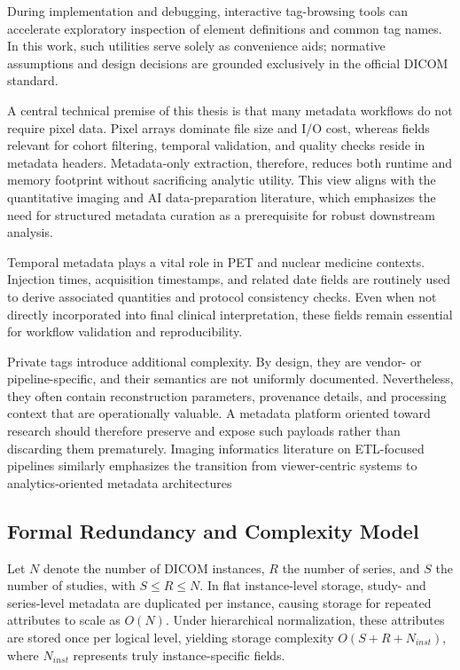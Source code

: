 During implementation and debugging, interactive tag-browsing tools can accelerate exploratory inspection of element definitions and common tag names\cite{dicomlookup}. In this work, such utilities serve solely as convenience aids; normative assumptions and design decisions are grounded exclusively in the official DICOM standard\cite{dicom}.

A central technical premise of this thesis is that many metadata workflows do not require pixel data. Pixel arrays dominate file size and I/O cost, whereas fields relevant for cohort filtering, temporal validation, and quality checks reside in metadata headers. Metadata-only extraction, therefore, reduces both runtime and memory footprint without sacrificing analytic utility. This view aligns with the quantitative imaging and AI data-preparation literature, which emphasizes the need for structured metadata curation as a prerequisite for robust downstream analysis\cite{fedorov_qin, DIAZ202125}.

Temporal metadata plays a vital role in PET and nuclear medicine contexts. Injection times, acquisition timestamps, and related date fields are routinely used to derive associated quantities and protocol consistency checks. Even when not directly incorporated into final clinical interpretation, these fields remain essential for workflow validation and reproducibility.

Private tags introduce additional complexity. By design, they are vendor- or pipeline-specific, and their semantics are not uniformly documented. Nevertheless, they often contain reconstruction parameters, provenance details, and processing context that are operationally valuable. A metadata platform oriented toward research should therefore preserve and expose such payloads rather than discarding them prematurely. Imaging informatics literature on ETL-focused pipelines similarly emphasizes the transition from viewer-centric systems to analytics-oriented metadata architectures\cite{software1020009} 

\subsection{Formal Redundancy and Complexity Model}

Let \(N\) denote the number of DICOM instances, \(R\) the number of series, and \(S\) the number of studies, with \(S \le R \le N\). In flat instance-level storage, study- and series-level metadata are duplicated per instance, causing storage for repeated attributes to scale as \(O(N)\). Under hierarchical normalization, these attributes are stored once per logical level, yielding storage complexity \(O(S+R+N_{inst})\), where \(N_{inst}\) represents truly instance-specific fields.

